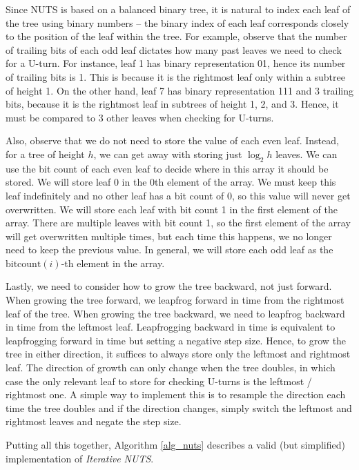 \documentclass[12pt]{article}
\begin{document}
Since NUTS is based on a balanced binary tree, it is natural to index each leaf of the tree using binary numbers -- the binary index of each leaf corresponds closely to the position of the leaf within the tree. For example, observe that the number of trailing bits of each odd leaf dictates how many past leaves we need to check for a U-turn. For instance, leaf 1 has binary representation 01, hence its number of trailing bits is 1. This is because it is the rightmost leaf only within a subtree of height 1. On the other hand, leaf 7 has binary representation 111 and 3 trailing bits, because it is the rightmost leaf in subtrees of height 1, 2, and 3. Hence, it must be compared to 3 other leaves when checking for U-turns.

Also, observe that we do not need to store the value of each even leaf. Instead, for a tree of height $h$, we can get away with storing just $\log_2 h$ leaves. We can use the bit count of each even leaf to decide where in this array it should be stored. We will store leaf 0 in the 0th element of the array. We must keep this leaf indefinitely and no other leaf has a bit count of 0, so this value will never get overwritten. We will store each leaf with bit count 1 in the first element of the array. There are multiple leaves with bit count 1, so the first element of the array will get overwritten multiple times, but each time this happens, we no longer need to keep the previous value. In general, we will store each odd leaf as the $\text{bitcount}(i)$-th element in the array.

Lastly, we need to consider how to grow the tree backward, not just forward. When growing the tree forward, we leapfrog forward in time from the rightmost leaf of the tree. When growing the tree backward, we need to leapfrog backward in time from the leftmost leaf. Leapfrogging backward in time is equivalent to leapfrogging forward in time but setting a negative step size. Hence, to grow the tree in either direction, it suffices to always store only the leftmost and rightmost leaf. The direction of growth can only change when the tree doubles, in which case the only relevant leaf to store for checking U-turns is the leftmost / rightmost one. A simple way to implement this is to resample the direction each time the tree doubles and if the direction changes, simply switch the leftmost and rightmost leaves and negate the step size.

Putting all this together, Algorithm \ref{alg_nuts} describes a valid (but simplified) implementation of \textit{Iterative NUTS}.
\end{document}
